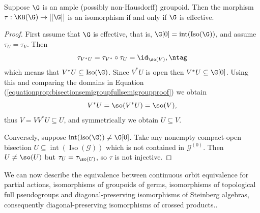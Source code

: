 \begin{proposition}\label{prop:bisectionsemigroupfullsemigroup}
Suppose $\G$ is an ample (possibly non-Hausdorff) groupoid. Then the morphism $\tau:\KB(\G)\to [[\G]]$ is an isomorphism if and only if $\G$ is effective.
\end{proposition}
\begin{proof}
First assume that $\G$ is effective, that is, $\G[0]=\operatorname{int}(\operatorname{Iso}(\G))$, and assume $\tau_U=\tau_V$. Then
\[\tau_{V^*U}=\tau_{V^*}\circ\tau_U=\id_{\so(V)},\ntag\label{equationprop:bisectionsemigroupfullsemigroupproof}\]
which means that $V^*U\subseteq \operatorname{Iso}(\G)$. Since $V^*U$ is open then $V^*U\subseteq\G[0]$. Using this and comparing the domains in Equation (\ref{equationprop:bisectionsemigroupfullsemigroupproof}) we obtain
\[V^*U=\so(V^*U)=\so(V),\]
thus $V=VV^*U\subseteq U$, and symmetrically we obtain $U\subseteq V$.

Conversely, suppose $\operatorname{int}(\operatorname{Iso}(\G))\neq\G[0]$. Take any nonempty compact-open bisection $U\subseteq\operatorname{int}(\operatorname{Iso}(\mathcal{G}))$ which is not contained in $\mathcal{G}^{(0)}$. Then $U\neq \so(U)$ but $\tau_U=\tau_{\so(U)}$, so $\tau$ is not injective.\qedhere
\end{proof}

We can now describe the equivalence between continuous orbit equivalence for partial actions, isomorphisms of groupoids of germs, isomorphisms of topological full pseudogroups and diagonal-preserving isomorphisms of Steinberg algebras, consequently diagonal-preserving isomorphisms of crossed products..

